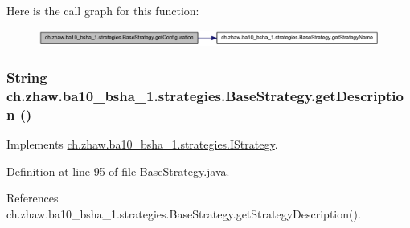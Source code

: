 Here is the call graph for this function:\nopagebreak
\begin{figure}[H]
\begin{center}
\leavevmode
\includegraphics[width=337pt]{classch_1_1zhaw_1_1ba10__bsha__1_1_1strategies_1_1BaseStrategy_a38329740106081e084162fb2e2c25f07_cgraph}
\end{center}
\end{figure}
\hypertarget{classch_1_1zhaw_1_1ba10__bsha__1_1_1strategies_1_1BaseStrategy_a56e779e4ce93ac1570b34bcde23e7455}{
\subsubsection[{getDescription}]{\setlength{\rightskip}{0pt plus 5cm}String ch.zhaw.ba10\_\-bsha\_\-1.strategies.BaseStrategy.getDescription ()}}
\label{classch_1_1zhaw_1_1ba10__bsha__1_1_1strategies_1_1BaseStrategy_a56e779e4ce93ac1570b34bcde23e7455}


Implements \hyperlink{interfacech_1_1zhaw_1_1ba10__bsha__1_1_1strategies_1_1IStrategy_ab1ebc130da7b0792d736a8b5f9cf595d}{ch.zhaw.ba10\_\-bsha\_\-1.strategies.IStrategy}.

Definition at line 95 of file BaseStrategy.java.

References ch.zhaw.ba10\_\-bsha\_\-1.strategies.BaseStrategy.getStrategyDescription().

